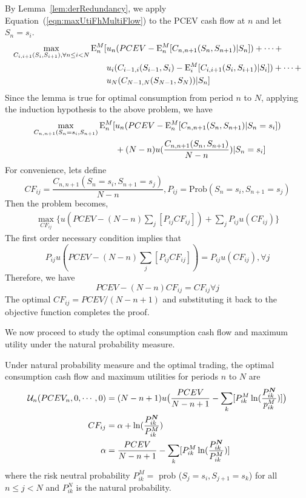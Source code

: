 By Lemma~\ref{lem:derRedundancy}, we apply Equation~(\ref{eqn:maxUtiFhMultiFlow}) to the PCEV cash flow at $n$ and let $S_n = s_i$.
\begin{align*}
\max_{C_{i,i+1}(S_i,S_{i+1}), \forall n \leq i < N} \mathrm{E}_{n}^M[ &u_{n} (PCEV - \mathrm{E}_{n}^M[C_{n,n+1}(S_{n},S_{n+1})|S_{n}]) +\cdots+ \\
& u_i( C_{i-1,i}(S_{i-1},S_i) - \mathrm{E}_{i}^M[C_{i,i+1}(S_{i},S_{i+1})|S_i]) + \cdots +  \\
&u_N(C_{N-1,N}(S_{N-1},S_N))|S_n]
\end{align*}
Since the lemma is true for optimal consumption from period $n$ to $N$, applying the induction hypothesis to the above problem, we have
\begin{align*}
\max_{C_{n,n+1}(S_n=s_i,S_{n+1})} \mathrm{E}_{n}^M[ &u_{n} (PCEV - \mathrm{E}_{n}^M[C_{n,n+1}(S_{n},S_{n+1})|S_{n}=s_i]) \\& + (N-n) u(\frac{C_{n,n+1}(S_n,S_{n+1})}{N-n})|S_n=s_i]
\end{align*}
For convenience, lets define
\[ CF_{ij} = \frac{C_{n,n+1}(S_n=s_i,S_{n+1}=s_j)}{N-n}, P_{ij} = \text{Prob} (S_n=s_i,S_{n+1}=s_j)\]
Then the problem becomes,
\begin{align*}
\max_{CF_{ij}} \{u(PCEV-(N-n)\sum_{j} [P_{ij}CF_{ij}]) + \sum_{j} P_{ij}u(CF_{ij}) \}
\end{align*}
The first order necessary condition implies that
\[P_{ij} u(PCEV-(N-n)\sum_{j} [P_{ij}CF_{ij}]) = P_{ij}u(CF_{ij}), \forall j \]
Therefore, we have
\[PCEV - (N-n) CF_{ij} = CF_{ij} \forall j \]
The optimal $CF_{ij} = PCEV/(N-n+1)$ and substituting it back to the objective function completes the proof.
\endproof

We now proceed to study the optimal consumption cash flow and maximum utility under the natural probability measure. 

{\lemma Under natural probability measure and the optimal trading, the optimal consumption cash flow and maximum utilities for periods $n$ to $N$ are
\begin{align}
\mathcal{U}_n(PCEV_n, 0,\cdots, 0) &= (N-n+1) u\big{(}\frac{PCEV}{N-n+1} - \sum_{k}[P_{ik}^M\ln(\frac{P_{ik}^{\bm{N}}}{p_{ik}^M})]\big{)} \\
CF_{ij} &= \alpha + \ln(\frac{P_{ik}^{\bm{N}}}{P_{ik}^M}) \\
\alpha &= \frac{PCEV}{N-n+1} - \sum_{k}[P_{ik}^M\ln(\frac{P_{ik}^{\bm{N}}}{P_{ik}^M})]\
\end{align}
where the risk neutral probability $P_{ik}^M =$ prob ($S_{j} = s_i, S_{j+1} = s_k$) for all $n\leq j < N$ and $P_{ik}^N$ is the natural probability.
}

